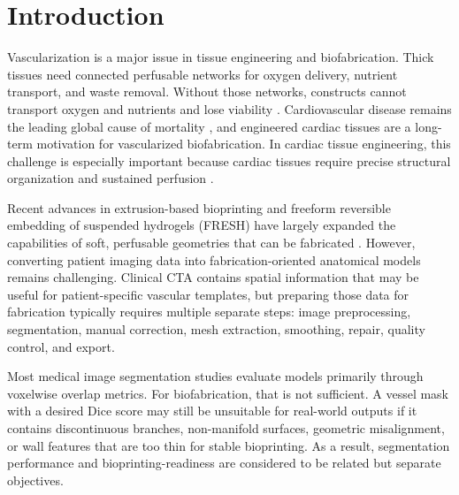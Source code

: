 \documentclass[anonymous]{iopjournal}
\begin{document}
\vspace{0.8em}
\date{}

\section{Introduction}

Vascularization is a major issue in tissue engineering and biofabrication. Thick tissues need connected perfusable networks for oxygen delivery, nutrient transport, and waste removal. Without those networks, constructs cannot transport oxygen and nutrients and lose viability \cite{murphy2014,lovett2009,rouwkema2016,oconnor2022}. Cardiovascular disease remains the leading global cause of mortality \cite{who,tsao2023}, and engineered cardiac tissues are a long-term motivation for vascularized biofabrication. In cardiac tissue engineering, this challenge is especially important because cardiac tissues require precise structural organization and sustained perfusion \cite{murphy2020,noor2019,wu2023}.

Recent advances in extrusion-based bioprinting and freeform reversible embedding of suspended hydrogels (FRESH) have largely expanded the capabilities of soft, perfusable geometries that can be fabricated \cite{kolesky2014,ozbolat2016,hinton2015}. However, converting patient imaging data into fabrication-oriented anatomical models remains challenging. Clinical CTA contains spatial information that may be useful for patient-specific vascular templates, but preparing those data for fabrication typically requires multiple separate steps: image preprocessing, segmentation, manual correction, mesh extraction, smoothing, repair, quality control, and export.

Most medical image segmentation studies evaluate models primarily through voxelwise overlap metrics. For biofabrication, that is not sufficient. A vessel mask with a desired Dice score may still be unsuitable for real-world outputs if it contains discontinuous branches, non-manifold surfaces, geometric misalignment, or wall features that are too thin for stable bioprinting. As a result, segmentation performance and bioprinting-readiness are considered to be related but separate objectives.
\end{document}
